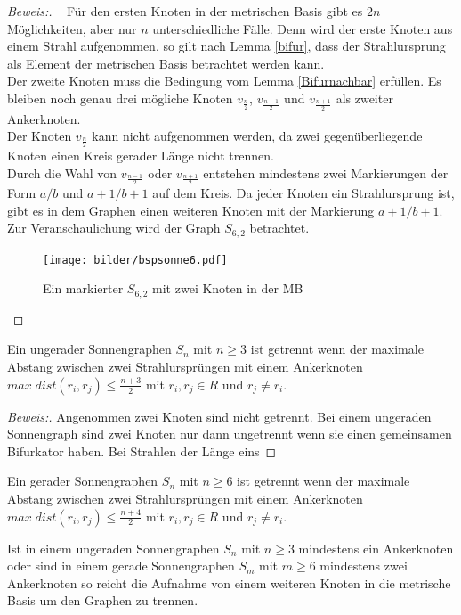 \begin{proof}[Beweis:]~
Für den ersten Knoten in der metrischen Basis gibt es $2n$ Möglichkeiten, aber nur $n$ unterschiedliche Fälle. Denn wird der erste Knoten aus einem Strahl aufgenommen, so gilt nach Lemma \ref{bifur}, dass der Strahlursprung als Element der metrischen Basis betrachtet werden kann.\\
Der zweite Knoten muss die Bedingung vom Lemma \ref{Bifurnachbar} erfüllen. Es bleiben noch genau drei mögliche Knoten $v_{\frac{n}{2}}$, $v_{\frac{n-1}{2}}$ und $v_{\frac{n+1}{2}}$ als zweiter Ankerknoten.\\ 
Der Knoten $v_{\frac{n}{2}}$ kann nicht aufgenommen werden, da zwei gegenüberliegende Knoten einen Kreis gerader Länge nicht trennen.\\
Durch die Wahl von $v_{\frac{n-1}{2}}$ oder $v_{\frac{n+1}{2}}$ entstehen mindestens zwei Markierungen der Form $a/b$ und $a+1/b+1$ auf dem Kreis. Da jeder Knoten ein Strahlursprung ist, gibt es in dem Graphen einen weiteren Knoten mit der Markierung $a+1/b+1$. Zur Veranschaulichung wird der Graph $S_{6,2}$ betrachtet.
\begin{figure}[h!]
		\centering
 		 \texttt{[image: bilder/bspsonne6.pdf]}
   \caption{Ein markierter $S_{6,2}$ mit zwei Knoten in der MB}
  	 \end{figure}
\end{proof}
\begin{lem}
Ein ungerader Sonnengraphen $S_n$ mit $n\geq 3$ ist getrennt wenn der maximale Abstang zwischen zwei Strahlursprüngen mit einem Ankerknoten $max\;dist(r_i,r_j)\leq \frac{n+3}{2}$ mit $r_i,r_j \in R$ und $r_j\neq r_i$.
\end{lem}
\begin{proof}[Beweis:]
Angenommen zwei Knoten sind nicht getrennt. Bei einem ungeraden Sonnengraph sind zwei Knoten nur dann ungetrennt wenn sie einen gemeinsamen Bifurkator haben. Bei Strahlen der Länge eins
\end{proof}
\begin{lem}
Ein gerader Sonnengraphen $S_n$ mit $n\geq 6$ ist getrennt wenn der maximale Abstang zwischen zwei Strahlursprüngen mit einem Ankerknoten $max\;dist(r_i,r_j)\leq \frac{n+4}{2}$ mit $r_i,r_j \in R$ und $r_j\neq r_i$.
\end{lem}
\begin{lem}
Ist in einem ungeraden Sonnengraphen $S_n$ mit $n\geq 3$ mindestens ein Ankerknoten oder sind in einem gerade Sonnengraphen $S_m$ mit $m\geq 6$ mindestens zwei Ankerknoten so reicht die Aufnahme von einem weiteren Knoten in die metrische Basis um den Graphen zu trennen. 
\end{lem}
